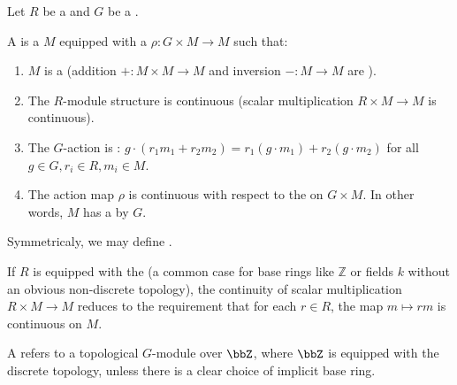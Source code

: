 \begin{definition} \label{definition:topological_module_over_a_group_ring_of_a_topological_group_over_a_topological_ring}
Let $R$ be a  and $G$ be a . 

A  is a  $M$ equipped with a  $\rho: G \times M \to M$ such that:
\begin{enumerate}
    \item $M$ is a  (addition $+: M \times M \to M$ and inversion $-: M \to M$ are ).
    \item The $R$-module structure is continuous (scalar multiplication $R \times M \to M$ is continuous).
    \item The $G$-action is : $g \cdot (r_1 m_1 + r_2 m_2) = r_1 (g \cdot m_1) + r_2 (g \cdot m_2)$ for all $g \in G, r_i \in R, m_i \in M$.
    \item The action map $\rho$ is continuous with respect to the  on $G \times M$. In other words, $M$ has a  by $G$.
\end{enumerate}

Symmetricaly, we may define .

If $R$ is equipped with the  (a common case for base rings like $\mathbb{Z}$ or fields $k$ without an obvious non-discrete topology), the continuity of scalar multiplication $R \times M \to M$ reduces to the requirement that for each $r \in R$, the map $m \mapsto rm$ is continuous on $M$.

A  refers to a topological $G$-module over $\bbZ$, where $\bbZ$ is equipped with the discrete topology, unless there is a clear choice of implicit base ring.

\end{definition}